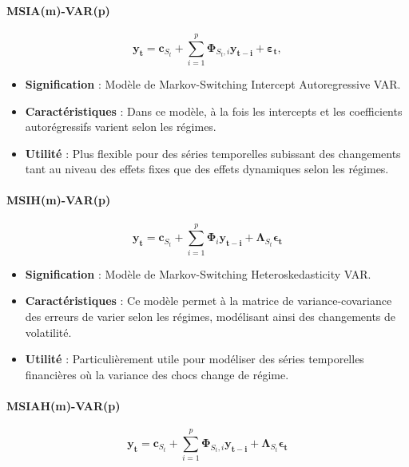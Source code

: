 \begin{sloppypar}
\paragraph{MSIA(m)-VAR(p)}

\begin{equation}
    \bm{y_t} = \bm{c}_{S_t} + \sum_{i=1}^{p} \bm{\Phi}_{S_t,i} \bm{y_{t-i}} + \bm{\varepsilon_t},
\end{equation}

\begin{itemize}
    \item \textbf{Signification} : Modèle de Markov-Switching Intercept Autoregressive VAR.
    \item \textbf{Caractéristiques} : Dans ce modèle, à la fois les intercepts et les coefficients autorégressifs varient selon les régimes.
    \item \textbf{Utilité} : Plus flexible pour des séries temporelles subissant des changements tant au niveau des effets fixes que des effets dynamiques selon les régimes.
\end{itemize}

\paragraph{MSIH(m)-VAR(p)}

\begin{equation}
    \bm{y_t} = \bm{c}_{S_t} + \sum_{i=1}^{p} \bm{\Phi}_i \bm{y_{t-i}} + \bm{\Lambda}_{S_t} \bm{\epsilon_t} 
\end{equation}

\begin{itemize}
    \item \textbf{Signification} : Modèle de Markov-Switching Heteroskedasticity VAR.
    \item \textbf{Caractéristiques} : Ce modèle permet à la matrice de variance-covariance des erreurs de varier selon les régimes, modélisant ainsi des changements de volatilité.
    \item \textbf{Utilité} : Particulièrement utile pour modéliser des séries temporelles financières où la variance des chocs change de régime.
\end{itemize}

\paragraph{MSIAH(m)-VAR(p)}

\begin{equation}
    \bm{y_t} = \bm{c}_{S_t} + \sum_{i=1}^{p} \bm{\Phi}_{S_t,i} \bm{y_{t-i}} + \bm{\Lambda}_{S_t} \bm{\epsilon_t} 
\end{equation}


\end{sloppypar}
